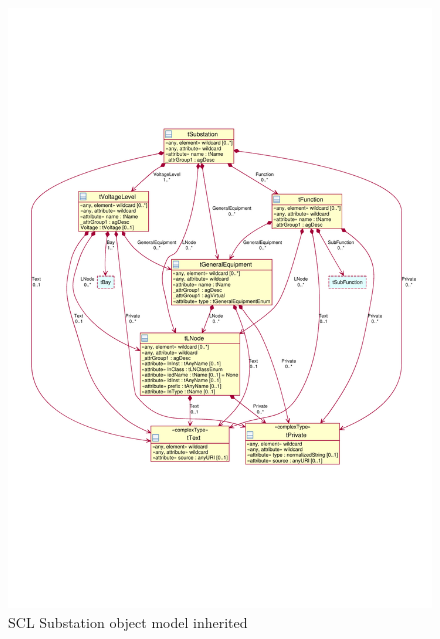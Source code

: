 \begin{figure}
  \includegraphics[width=1.0\linewidth]
  				{chapters/ch-scl/figures/SCL-uml-substation-Deept2-inherited}
  \caption{SCL Substation object model inherited  }
  \label{fig:pdf-SCL-uml-substation-Deept2-inherited}
\end{figure}



